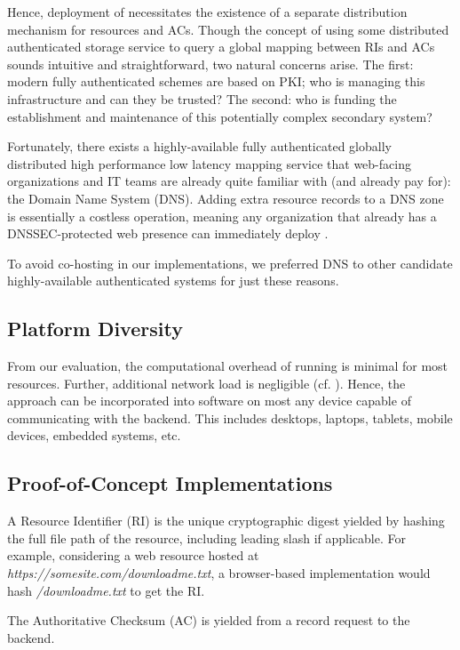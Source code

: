 Hence, deployment of \SYSTEM{} necessitates the existence of a separate
distribution mechanism for resources and ACs. Though the concept of using some
distributed authenticated storage service to query a global mapping between RIs
and ACs sounds intuitive and straightforward, two natural concerns arise. The
first: modern fully authenticated schemes are based on PKI; who is managing
this infrastructure and can they be trusted? The second: who is funding the
establishment and maintenance of this potentially complex secondary system?

Fortunately, there exists a highly-available fully authenticated globally
distributed high performance low latency mapping service that web-facing
organizations and IT teams are already quite familiar with (and already pay
for): the Domain Name System (DNS). Adding extra resource records to a DNS zone
is essentially a costless operation, meaning any organization that already has a
DNSSEC-protected web presence can immediately deploy \SYSTEM{}.

To avoid co-hosting in our implementations, we preferred DNS to other candidate
highly-available authenticated systems for just these reasons.

\subsection{Platform Diversity}

From our evaluation, the computational overhead of running \SYSTEM{} is minimal
for most resources. Further, additional network load is negligible (cf.
). Hence, the \SYSTEM{} approach can be incorporated into
software on most any device capable of communicating with the backend. This
includes desktops, laptops, tablets, mobile devices, embedded systems, etc.

\subsection{Proof-of-Concept Implementations}

A Resource Identifier (RI) is the unique cryptographic digest yielded by hashing
the full file path of the resource, including leading slash if applicable. For
example, considering a web resource hosted at
\textit{https://somesite.com/downloadme.txt}, a browser-based \SYSTEM{}
implementation would hash \textit{/downloadme.txt} to get the RI.

The Authoritative Checksum (AC) is yielded from a record request to the backend.

